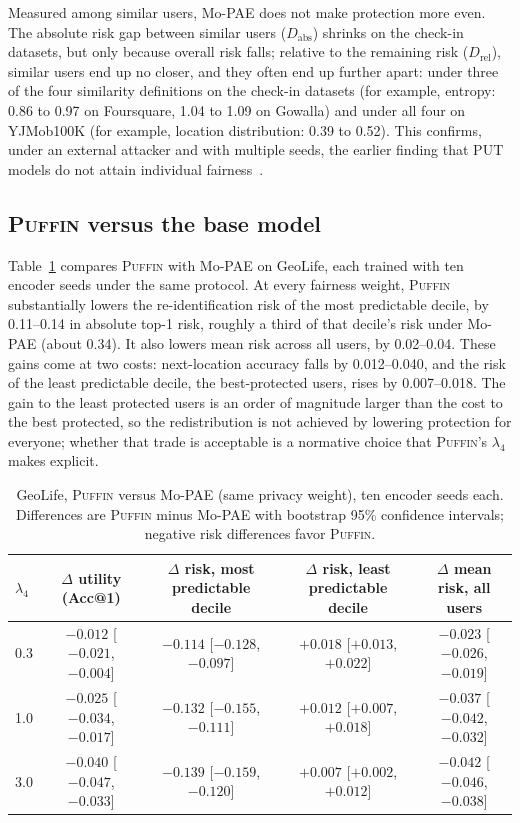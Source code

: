\documentclass[sigconf,anonymous,review]{acmart}
\newcommand{\puffin}{\textsc{Puffin}}
\begin{document}
Measured among similar users, Mo-PAE does not make protection more even. The absolute risk gap between similar users ($D_{\mathrm{abs}}$) shrinks on the check-in datasets, but only because overall risk falls; relative to the remaining risk ($D_{\mathrm{rel}}$), similar users end up no closer, and they often end up further apart: under three of the four similarity definitions on the check-in datasets (for example, entropy: 0.86 to 0.97 on Foursquare, 1.04 to 1.09 on Gowalla) and under all four on YJMob100K (for example, location distribution: 0.39 to 0.52). This confirms, under an external attacker and with multiple seeds, the earlier finding that PUT models do not attain individual fairness~\cite{zhan2023fairness}.

\subsection{\puffin{} versus the base model}
\label{sec:results-puffin}
Table~\ref{tab:geolife} compares \puffin{} with Mo-PAE on GeoLife, each trained with ten encoder seeds under the same protocol. At every fairness weight, \puffin{} substantially lowers the re-identification risk of the most predictable decile, by 0.11--0.14 in absolute top-1 risk, roughly a third of that decile's risk under Mo-PAE (about 0.34). It also lowers mean risk across all users, by 0.02--0.04. These gains come at two costs: next-location accuracy falls by 0.012--0.040, and the risk of the least predictable decile, the best-protected users, rises by 0.007--0.018. The gain to the least protected users is an order of magnitude larger than the cost to the best protected, so the redistribution is not achieved by lowering protection for everyone; whether that trade is acceptable is a normative choice that \puffin's $\lambda_4$ makes explicit.

\begin{table}[t]
\centering
\caption{GeoLife, \puffin{} versus Mo-PAE (same privacy weight), ten encoder seeds each. Differences are \puffin{} minus Mo-PAE with bootstrap 95\% confidence intervals; negative risk differences favor \puffin.}
\label{tab:geolife}
\small
\begin{tabular}{@{}lcccc@{}}
\toprule
$\lambda_4$ & $\Delta$ utility (Acc@1) & $\Delta$ risk, most predictable decile & $\Delta$ risk, least predictable decile & $\Delta$ mean risk, all users \\
\midrule
0.3 & $-0.012$ [$-0.021$, $-0.004$] & $-0.114$ [$-0.128$, $-0.097$] & $+0.018$ [$+0.013$, $+0.022$] & $-0.023$ [$-0.026$, $-0.019$] \\
1.0 & $-0.025$ [$-0.034$, $-0.017$] & $-0.132$ [$-0.155$, $-0.111$] & $+0.012$ [$+0.007$, $+0.018$] & $-0.037$ [$-0.042$, $-0.032$] \\
3.0 & $-0.040$ [$-0.047$, $-0.033$] & $-0.139$ [$-0.159$, $-0.120$] & $+0.007$ [$+0.002$, $+0.012$] & $-0.042$ [$-0.046$, $-0.038$] \\
\bottomrule
\end{tabular}
\end{table}
\end{document}

